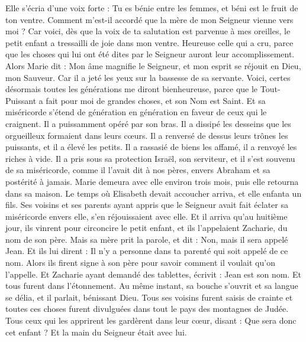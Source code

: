 \begin{multicols}{2}
Elle s'écria d’une voix forte : Tu es bénie entre les femmes, et béni est le fruit de ton ventre.
Comment m’est-il accordé que la mère de mon Seigneur vienne vers moi ?
Car voici, dès que la voix de ta salutation est parvenue à mes oreilles, le petit enfant a tressailli de joie dans mon ventre.
Heureuse celle qui a cru, parce que les choses qui lui ont été dites par le Seigneur auront leur accomplissement.
Alors Marie dit : Mon âme magnifie le Seigneur,
et mon esprit se réjouit en Dieu, mon Sauveur.
Car il a jeté les yeux sur la bassesse de sa servante. Voici, certes désormais toutes les générations me diront bienheureuse,
parce que le Tout-Puissant a fait pour moi de grandes choses, et son Nom est Saint.
Et sa miséricorde s’étend de génération en génération en faveur de ceux qui le craignent.
Il a puissamment opéré par son bras. Il a dissipé les desseins que les orgueilleux formaient dans leurs cœurs.
Il a renversé de dessus leurs trônes les puissants, et il a élevé les petits.
Il a rassasié de biens les affamé, il a renvoyé les riches à vide.
Il a pris sous sa protection Israël, son serviteur, et il s’est souvenu de sa miséricorde,
comme il l’avait dit à nos pères, envers Abraham et sa postérité à jamais.
Marie demeura avec elle environ trois mois, puis elle retourna dans sa maison.
Le temps où Elisabeth devait accoucher arriva, et elle enfanta un fils.
Ses voisins et ses parents ayant appris que le Seigneur avait fait éclater sa miséricorde envers elle, s'en réjouissaient avec elle.
Et il arriva qu'au huitième jour, ils vinrent pour circoncire le petit enfant, et ils l'appelaient Zacharie, du nom de son père.
Mais sa mère prit la parole, et dit : Non, mais il sera appelé Jean.
Et ils lui dirent : Il n'y a personne dans ta parenté qui soit appelé de ce nom.
Alors ils firent signe à son père pour savoir comment il voulait qu’on l’appelle.
Et Zacharie ayant demandé des tablettes, écrivit : Jean est son nom. Et tous furent dans l’étonnement.
Au même instant, sa bouche s’ouvrit et sa langue se délia, et il parlait, bénissant Dieu.
Tous ses voisins furent saisis de crainte et toutes ces choses furent divulguées dans tout le pays des montagnes de Judée.
Tous ceux qui les apprirent les gardèrent dans leur cœur, disant : Que sera donc cet enfant ? Et la main du Seigneur était avec lui.

\end{multicols}
